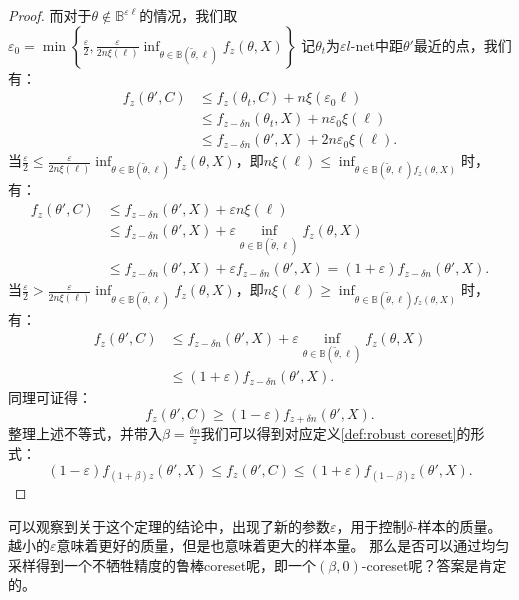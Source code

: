\begin{proof}
而对于$\theta\notin\mathbb{B}^{\varepsilon \ell}$的情况，我们取$\varepsilon_0=\min\left\{\frac{\varepsilon}{2}, \frac{\varepsilon}{2n\xi(\ell)}\inf_{\theta\in\mathbb{B}(\tilde{\theta},\ell)}f_z(\theta,X)\right\}$
记$\theta_t$为$\varepsilon l$-net中距$\theta'$最近的点，我们有：
\begin{align*}
    f_z(\theta',C)&\leq f_z(\theta_t,C)+n\xi(\varepsilon_0\ell)\\
    &\leq f_{z-\delta n}(\theta_t,X)+n\varepsilon_0\xi(\ell)\\
    &\leq f_{z-\delta n}(\theta',X)+2n\varepsilon_0\xi(\ell).
\end{align*}
当$\frac\varepsilon 2 \le \frac{\varepsilon}{2n\xi(\ell)}\inf_{\theta\in\mathbb{B}(\tilde{\theta},\ell)}f_z(\theta,X)$，即$n\xi(\ell)\le\inf_{\theta\in\mathbb{B}(\tilde{\theta},\ell)f_z(\theta,X)}$时，有：
\begin{align*}
    f_z(\theta',C)&\leq f_{z-\delta n}(\theta',X)+\varepsilon n \xi(\ell)\\
    &\leq f_{z-\delta n}(\theta',X)+\varepsilon \inf_{\theta\in\mathbb{B}(\tilde{\theta},\ell)}f_z(\theta,X)\\
    &\leq f_{z-\delta n}(\theta',X)+\varepsilon f_{z-\delta n}(\theta',X)=(1+\varepsilon)f_{z-\delta n}(\theta',X).
\end{align*}
当$\frac\varepsilon 2 > \frac{\varepsilon}{2n\xi(\ell)}\inf_{\theta\in\mathbb{B}(\tilde{\theta},\ell)}f_z(\theta,X)$，即$n\xi(\ell)\ge\inf_{\theta\in\mathbb{B}(\tilde{\theta},\ell)f_z(\theta,X)}$时，有：
\begin{align*}
    f_z(\theta',C)&\leq f_{z-\delta n}(\theta',X)+\varepsilon \inf_{\theta \in \mathbb{B}(\tilde{\theta},\ell)}f_{z}(\theta,X)\\
    &\leq (1+\varepsilon)f_{z-\delta n}(\theta',X).
\end{align*}
同理可证得：
\begin{equation}
    f_z(\theta',C)\geq (1-\varepsilon)f_{z+\delta n}(\theta',X).
\end{equation}
整理上述不等式，并带入$\beta=\frac{\delta n}{z}$我们可以得到对应定义\ref{def:robust coreset}的形式：
\begin{equation}
    (1-\varepsilon)f_{(1+\beta)z}(\theta',X) \leq f_z(\theta',C) \leq (1+\varepsilon)f_{(1-\beta)z}(\theta',X).
\end{equation}

\end{proof}

可以观察到关于这个定理的结论中，出现了新的参数$\varepsilon$，用于控制$\delta$-样本的质量。越小的$\varepsilon$意味着更好的质量，但是也意味着更大的样本量。
那么是否可以通过均匀采样得到一个不牺牲精度的鲁棒coreset呢，即一个$(\beta,0)$-coreset呢？答案是肯定的。

